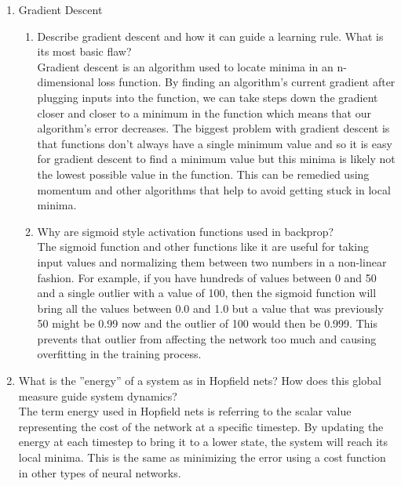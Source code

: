 \documentclass[notitlepage]{report}
\theoremstyle{plain} %
\theoremstyle{definition} %
\theoremstyle{plain} %
\begin{document}
\begin{enumerate}
\item Gradient Descent
	\begin{enumerate}
	\item Describe gradient descent and how it can guide a learning rule. What is its most basic flaw?
	\medskip\\
		Gradient descent is an algorithm used to locate minima in an n-dimensional loss function. By finding an algorithm's current gradient after plugging inputs into the function, we can take steps down the gradient closer and closer to a minimum in the function which means that our algorithm's error decreases. The biggest problem with gradient descent is that functions don't always have a single minimum value and so it is easy for gradient descent to find a minimum value but this minima is likely not the lowest possible value in the function. This can be remedied using momentum and other algorithms that help to avoid getting stuck in local minima.
	\item Why are sigmoid style activation functions used in backprop?
	\medskip\\
		The sigmoid function and other functions like it are useful for taking input values and normalizing them between two numbers in a non-linear fashion. For example, if you have hundreds of values between 0 and 50 and a single outlier with a value of 100, then the sigmoid function will bring all the values between 0.0 and 1.0 but a value that was previously 50 might be 0.99 now and the outlier of 100 would then be 0.999. This prevents that outlier from affecting the network too much and causing overfitting in the training process.
	\end{enumerate}

\item What is the ''energy'' of a system as in Hopfield nets? How does this global measure guide system dynamics?
\medskip\\
	The term energy used in Hopfield nets is referring to the scalar value representing the cost of the network at a specific timestep. By updating the energy at each timestep to bring it to a lower state, the system will reach its local minima. This is the same as minimizing the error using a cost function in other types of neural networks.
	

\end{enumerate}
\end{document}
